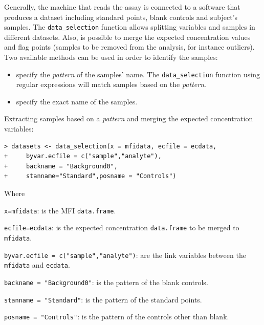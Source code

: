 \documentclass[11pt]{article}\usepackage[]{graphicx}\usepackage[]{color}
\makeatletter
\newenvironment{kframe}{%
 \def\at@end@of@kframe{}%
 \ifinner\ifhmode%
  \def\at@end@of@kframe{\end{minipage}}%
  \begin{minipage}{\columnwidth}%
 \fi\fi%
 \def\FrameCommand##1{\hskip\@totalleftmargin \hskip-\fboxsep
 \colorbox{shadecolor}{##1}\hskip-\fboxsep
     \hskip-\linewidth \hskip-\@totalleftmargin \hskip\columnwidth}%
 \MakeFramed {\advance\hsize-\width
   \@totalleftmargin\z@ \linewidth\hsize
   \@setminipage}}%
 {\par\unskip\endMakeFramed%
 \at@end@of@kframe}
\newenvironment{knitrout}{}{} %
\newenvironment{itemize*}%
    {\begin{itemize}%
        \setlength{\itemsep}{-0.35cm}%
        \setlength{\parskip}{10pt}}%
{\end{itemize}}
\makeatother
\begin{document}
Generally, the machine that reads the assay is connected to a software that produces a dataset including standard points, blank controls and subject's samples. The {\tt data\_selection} function allows splitting variables and samples in different datasets.  Also, is possible to merge the expected concentration values and flag points (samples to be removed from the analysis, for instance outliers). Two available methods can be used in order to identify the samples:

\begin{itemize}
 \item specify the \textit{pattern} of the samples' name. The {\tt data\_selection} 
 function  using regular expressions will match samples based 
 on the \textit{pattern}.
 \item specify the exact name of the samples.
\end{itemize}


\noindent Extracting samples based on a \textit{pattern} and merging the 
expected concentration variables:
\begin{knitrout}
\color{fgcolor}\begin{kframe}
\begin{verbatim}
> datasets <- data_selection(x = mfidata, ecfile = ecdata, 
+     byvar.ecfile = c("sample","analyte"),
+     backname = "Background0", 
+     stanname="Standard",posname = "Controls")
\end{verbatim}
\end{kframe}
\end{knitrout}

\noindent Where

\begin{itemize*}
    \item {\tt x=mfidata}: is the MFI {\tt data.frame}.
\item {\tt ecfile=ecdata}: is the expected concentration {\tt data.frame} to be merged 
to {\tt mfidata}.
\item {\tt byvar.ecfile = c("sample","analyte")}: are the link variables between
the {\tt mfidata} and {\tt ecdata}.
\item {\tt backname = "Background0"}: is the pattern of the blank controls.
\item {\tt stanname = "Standard"}: is the pattern of the standard points.
\item {\tt posname = "Controls"}: is the pattern of the controls other than blank.
\end{itemize*}
\end{document}
